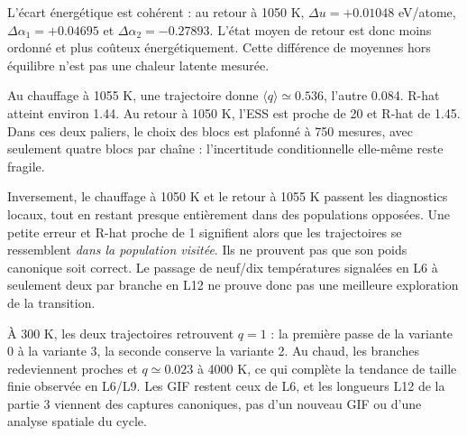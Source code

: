 L’écart énergétique est cohérent : au retour à 1050 K, $\Delta u=+0.01048$ eV/atome, $\Delta\alpha_1=+0.04695$ et $\Delta\alpha_2=-0.27893$. L’état moyen de retour est donc moins ordonné et plus coûteux énergétiquement. Cette différence de moyennes hors équilibre n’est pas une chaleur latente mesurée.


Au chauffage à 1055 K, une trajectoire donne $\langle q\rangle\simeq0.536$, l’autre 0.084. R-hat atteint environ 1.44. Au retour à 1050 K, l’ESS est proche de 20 et R-hat de 1.45. Dans ces deux paliers, le choix des blocs est plafonné à 750 mesures, avec seulement quatre blocs par chaîne : l’incertitude conditionnelle elle-même reste fragile.

Inversement, le chauffage à 1050 K et le retour à 1055 K passent les diagnostics locaux, tout en restant presque entièrement dans des populations opposées. Une petite erreur et R-hat proche de 1 signifient alors que les trajectoires se ressemblent \emph{dans la population visitée}. Ils ne prouvent pas que son poids canonique soit correct. Le passage de neuf/dix températures signalées en L6 à seulement deux par branche en L12 ne prouve donc pas une meilleure exploration de la transition.

À 300 K, les deux trajectoires retrouvent $q=1$ : la première passe de la variante 0 à la variante 3, la seconde conserve la variante 2. Au chaud, les branches redeviennent proches et $q\simeq0.023$ à 4000 K, ce qui complète la tendance de taille finie observée en L6/L9. Les GIF restent ceux de L6, et les longueurs L12 de la partie 3 viennent des captures canoniques, pas d’un nouveau GIF ou d’une analyse spatiale du cycle.


